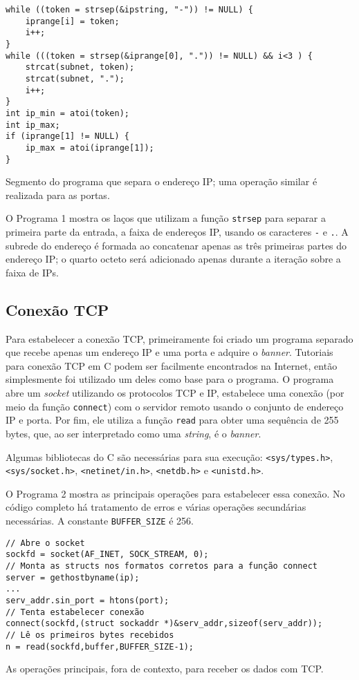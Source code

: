 \documentclass{sig-alternate-05-2015}
\begin{document}
\begin{program}
\begin{lstlisting}
while ((token = strsep(&ipstring, "-")) != NULL) {
    iprange[i] = token;
    i++;
}
while (((token = strsep(&iprange[0], ".")) != NULL) && i<3 ) {        
    strcat(subnet, token);
    strcat(subnet, ".");
    i++;
}
int ip_min = atoi(token);
int ip_max;
if (iprange[1] != NULL) {
    ip_max = atoi(iprange[1]);
}
\end{lstlisting}
\caption{Segmento do programa que separa o endereço IP; uma operação similar é realizada para as portas.}
\end{program}


O Programa 1 mostra os laços que utilizam a função \texttt{strsep} para separar a primeira parte da entrada, a faixa de endereços IP, usando os caracteres \texttt{-} e \texttt{.}.
A subrede do endereço é formada ao concatenar apenas as três primeiras partes do endereço IP; o quarto octeto será adicionado apenas durante a iteração sobre a faixa de IPs.

\subsection{Conexão TCP}
Para estabelecer a conexão TCP, primeiramente foi criado um programa separado que recebe apenas um endereço IP e uma porta e adquire o \textit{banner}.
Tutoriais para conexão TCP em C podem ser facilmente encontrados na Internet, então simplesmente foi utilizado um deles como base para o programa.
O programa abre um \textit{socket} utilizando os protocolos TCP e IP, estabelece uma conexão (por meio da função \texttt{connect}) com o servidor remoto usando o conjunto de endereço IP e porta.
Por fim, ele utiliza a função \texttt{read} para obter uma sequência de 255 bytes, que, ao ser interpretado como uma \textit{string}, é o \textit{banner}.

Algumas bibliotecas do C são necessárias para sua execução: \texttt{<sys/types.h>}, \texttt{<sys/socket.h>}, \texttt{<netinet/in.h>}, \texttt{<netdb.h>} e \texttt{<unistd.h>}.

O Programa 2 mostra as principais operações para estabelecer essa conexão.
No código completo há tratamento de erros e várias operações secundárias necessárias.
A constante \texttt{BUFFER\_SIZE} é 256.

\begin{program}
\begin{lstlisting}
// Abre o socket
sockfd = socket(AF_INET, SOCK_STREAM, 0);
// Monta as structs nos formatos corretos para a função connect
server = gethostbyname(ip);
...
serv_addr.sin_port = htons(port);
// Tenta estabelecer conexão
connect(sockfd,(struct sockaddr *)&serv_addr,sizeof(serv_addr));
// Lê os primeiros bytes recebidos
n = read(sockfd,buffer,BUFFER_SIZE-1);
\end{lstlisting}
\caption{As operações principais, fora de contexto, para receber os dados com TCP.}
\end{program}
\end{document}
